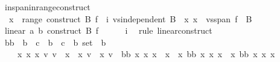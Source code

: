 \begin{isabellebody}
\ in{\isacharunderscore}{\kern0pt}span{\isacharunderscore}{\kern0pt}in{\isacharunderscore}{\kern0pt}range{\isacharunderscore}{\kern0pt}construct{\isacharcolon}{\kern0pt}\isanewline
\ \ {\isachardoublequoteopen}x\ {\isasymin}\ range\ {\isacharparenleft}{\kern0pt}construct\ B\ f{\isacharparenright}{\kern0pt}{\isachardoublequoteclose}\ \ i{\isacharcolon}{\kern0pt}\ {\isachardoublequoteopen}vs{}{\isachardot}{\kern0pt}independent\ B{\isachardoublequoteclose}\ \ x{\isacharcolon}{\kern0pt}\ {\isachardoublequoteopen}x\ {\isasymin}\ vs{}{\isachardot}{\kern0pt}span\ {\isacharparenleft}{\kern0pt}f\ {\isacharbackquote}{\kern0pt}\ B{\isacharparenright}{\kern0pt}{\isachardoublequoteclose}\isanewline
%
\isadelimproof
%
\endisadelimproof
%
\isatagproof
{}\isamarkupfalse%
\ {\isacharminus}{\kern0pt}\isanewline
\ \ \isamarkupfalse%
\ linear\ {\isachardoublequoteopen}{\isacharparenleft}{\kern0pt}{\isacharasterisk}{\kern0pt}a{\isacharparenright}{\kern0pt}{\isachardoublequoteclose}\ {\isachardoublequoteopen}{\isacharparenleft}{\kern0pt}{\isacharasterisk}{\kern0pt}b{\isacharparenright}{\kern0pt}{\isachardoublequoteclose}\ {\isachardoublequoteopen}construct\ B\ f{\isachardoublequoteclose}\isanewline
\ \ \ \ \isamarkupfalse%
\ i\ \isamarkupfalse%
\ {\isacharparenleft}{\kern0pt}rule\ linear{\isacharunderscore}{\kern0pt}construct{\isacharparenright}{\kern0pt}\isanewline
\ \ \isamarkupfalse%
\ bb\ {\isacharcolon}{\kern0pt}{\isacharcolon}{\kern0pt}\ {\isachardoublequoteopen}{\isacharparenleft}{\kern0pt}{\isacharprime}{\kern0pt}b\ {\isasymRightarrow}\ {\isacharprime}{\kern0pt}c{\isacharparenright}{\kern0pt}\ {\isasymRightarrow}\ {\isacharparenleft}{\kern0pt}{\isacharprime}{\kern0pt}b\ {\isasymRightarrow}\ {\isacharprime}{\kern0pt}c{\isacharparenright}{\kern0pt}\ {\isasymRightarrow}\ {\isacharprime}{\kern0pt}b\ set\ {\isasymRightarrow}\ {\isacharprime}{\kern0pt}b{\isachardoublequoteclose}\ \isanewline
\ \ \ \ {\isachardoublequoteopen}{\isasymforall}x{}\ x{}\ x{}{\isachardot}{\kern0pt}\ {\isacharparenleft}{\kern0pt}{\isasymexists}v{}{\isachardot}{\kern0pt}\ v{}\ {\isasymin}\ x{}\ {\isasymand}\ x{}\ v{}\ {\isasymnoteq}\ x{}\ v{}{\isacharparenright}{\kern0pt}\ {\isacharequal}{\kern0pt}\ {\isacharparenleft}{\kern0pt}bb\ x{}\ x{}\ x{}\ {\isasymin}\ x{}\ {\isasymand}\ x{}\ {\isacharparenleft}{\kern0pt}bb\ x{}\ x{}\ x{}{\isacharparenright}{\kern0pt}\ {\isasymnoteq}\ x{}\ {\isacharparenleft}{\kern0pt}bb\ x{}\ x{}\ x{}{\isacharparenright}{\kern0pt}{\isacharparenright}{\kern0pt}{\isachardoublequoteclose}\isanewline

\end{isabellebody}
